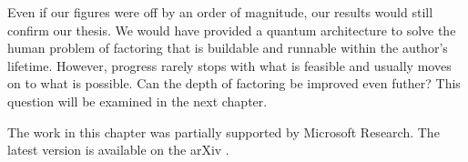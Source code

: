 Even if our figures were off by an order of magnitude,
our results would still confirm our thesis. We
would have provided a quantum architecture to solve
the human problem of factoring that is
buildable and runnable within the author's lifetime.
However, progress rarely stops with what is
feasible and usually moves on to what is possible.
Can the depth of factoring be improved even futher?
This question will be examined
in the next chapter.

The work in this chapter was partially supported by
Microsoft Research. The latest version is
available on the arXiv \cite{Pham2012}.